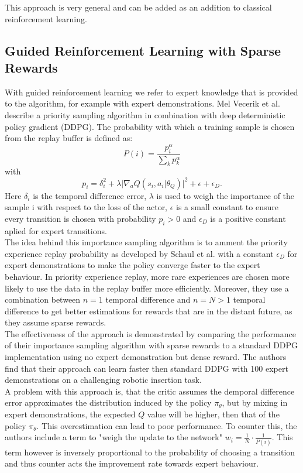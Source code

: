 This approach is very general and can be added as an addition to classical reinforcement learning.

\subsection{Guided Reinforcement Learning with Sparse Rewards}
\label{sec:rel_work_finetuning}
With guided reinforcement learning we refer to expert knowledge that is provided to the algorithm, for example with expert demonstrations.
Mel Vecerik et al. \cite{vecerik2018leveraging} describe a priority 
sampling algorithm in combination with deep deterministic policy gradient (DDPG). The probability with which a 
training sample is chosen from the replay buffer is defined as: 
\begin{equation}
    P(i) = \frac{p_i^\alpha}{\sum\limits_{k} p_k^\alpha}
\end{equation}
with 
\begin{equation}
    p_i = \delta_{i}^2 + \lambda \lvert \nabla_a Q(s_i, a_i \vert \theta_Q) \rvert^2 + \epsilon + \epsilon_{D}.
\end{equation}
Here $\delta_{i}$ is the temporal difference error, $\lambda$ is used to weigh the importance of the sample i with respect to the loss of the actor, 
$\epsilon$ is a small constant to ensure every transition is chosen with probability $p_i > 0$ and $\epsilon_D$ is a positive constant aplied for expert transitions.\\
The idea behind this importance sampling algorithm is to amment the priority experience replay probability as developed by Schaul et al. \cite{schaul2016prioritized} 
with a constant $\epsilon_{D}$ for expert demonstrations to make the policy converge faster to the expert behaviour. In priority experience replay, more rare 
experiences are chosen more likely to use the data in the replay buffer more efficiently. Moreover, they use a combination between $n=1$ temporal difference and 
$n=N > 1$ temporal difference to get better estimations for rewards that are in the distant future, as they assume sparse rewards.\\
The effectiveness of the approach is demonstrated by comparing the performance of their importance sampling algorithm with sparse rewards to a standard DDPG 
implementation using no expert demonstration but dense reward. The authors find that their approach can learn faster then standard DDPG with 100 expert 
demonstrations on a challenging robotic insertion task.\\ 
A problem with this approach is, that the critic assumes the demporal difference error approximates the distribution induced by the policy $\pi_{\theta}$, but by 
mixing in expert demonstrations, the expected $Q$ value will be higher, then that of the policy $\pi_{\theta}$. This overestimation can lead to poor performance. 
To counter this, the authors include a term to "weigh the update to the network" $w_i = \frac{1}{N} \cdot \frac{1}{P(i)}$. This term however is inversely proportional to the 
probability of choosing a transition and thus counter acts the improvement rate towards expert behaviour. 

